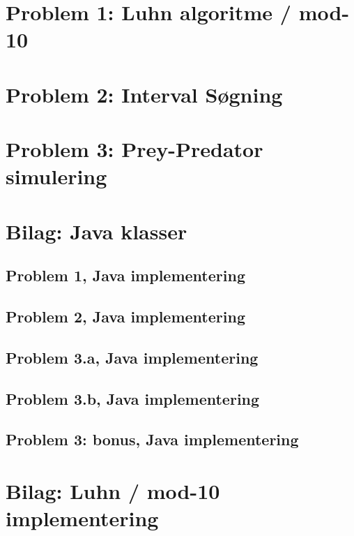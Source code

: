 \documentclass[a4paper]{article}
\begin{document}
\pagebreak

\section{Problem 1: Luhn algoritme / mod-10}


\section{Problem 2: Interval Søgning}


\section{Problem 3: Prey-Predator simulering}


\pagebreak
\section{Bilag: Java klasser}
\label{appendix}
\subsection*{Problem 1, Java implementering}

\subsection*{Problem 2, Java implementering}

\subsection*{Problem 3.a, Java implementering}

\subsection*{Problem 3.b, Java implementering}

\subsection*{Problem 3: bonus, Java implementering}

\section{Bilag: Luhn / mod-10 implementering}
\label{app:Luhn}

\end{document}
